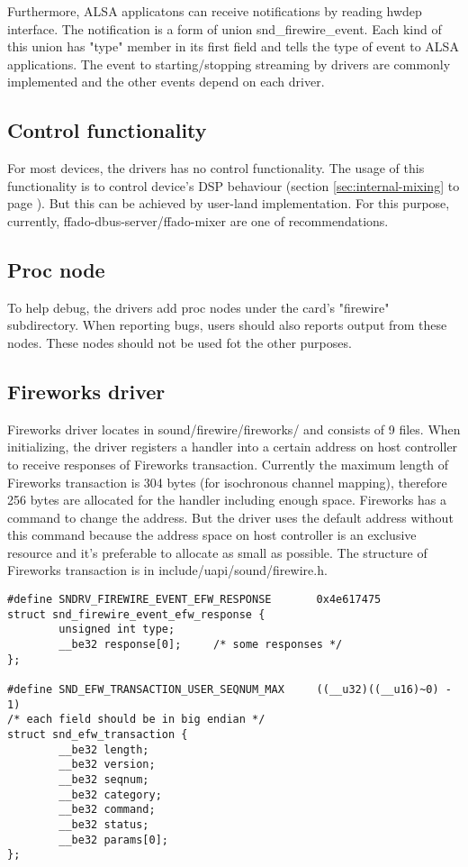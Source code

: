 \documentclass[onecolumn]{article}
\begin{document}
Furthermore, ALSA applicatons can receive notifications by reading hwdep interface. The notification is a form of union snd\_firewire\_event. Each kind of this union has "type" member in its first field and tells the type of event to ALSA applications. The event to starting/stopping streaming by drivers are commonly implemented and the other events depend on each driver.

\subsection{Control functionality}
For most devices, the drivers has no control functionality. The usage of this functionality is to control device's DSP behaviour (section \ref{sec:internal-mixing} to page \pageref{sec:internal-mixing}). But this can be achieved by user-land implementation. For this purpose, currently, ffado-dbus-server/ffado-mixer are one of recommendations.

\subsection{Proc node}

To help debug, the drivers add proc nodes under the card's "firewire" subdirectory. When reporting bugs, users should also reports output from these nodes. These nodes should not be used fot the other purposes.


\subsection{Fireworks driver}

Fireworks driver locates in sound/firewire/fireworks/ and consists of 9 files. When initializing, the driver registers a handler into a certain address on host controller to receive responses of Fireworks transaction. Currently the maximum length of Fireworks transaction is 304 bytes (for isochronous channel mapping), therefore 256 bytes are allocated for the handler including enough space. Fireworks has a command to change the address. But the driver uses the default address without this command because the address space on host controller is an exclusive resource and it's preferable to allocate as small as possible. The structure of Fireworks transaction is in include/uapi/sound/firewire.h.

\begin{verbatim}
#define SNDRV_FIREWIRE_EVENT_EFW_RESPONSE       0x4e617475
struct snd_firewire_event_efw_response {
        unsigned int type;
        __be32 response[0];     /* some responses */
};

#define SND_EFW_TRANSACTION_USER_SEQNUM_MAX     ((__u32)((__u16)~0) - 1)
/* each field should be in big endian */
struct snd_efw_transaction {
        __be32 length;
        __be32 version;
        __be32 seqnum;
        __be32 category;
        __be32 command;
        __be32 status;
        __be32 params[0];
};
\end{verbatim}
\end{document}
